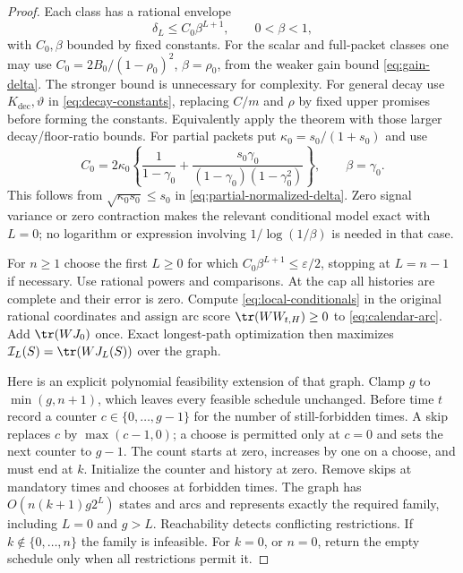 \begin{proof}
Each class has a rational envelope
\begin{equation}
 \delta_L\le C_0\beta^{L+1},\qquad 0<\beta<1,
 \label{eq:complexity-envelope}
\end{equation}
with $C_0,\beta$ bounded by fixed constants. For the scalar and full-packet
classes one may use $C_0=2B_0/(1-\rho_0)^2$, $\beta=\rho_0$, from the
weaker gain bound \eqref{eq:gain-delta}. The stronger bound is unnecessary
for complexity. For general decay use $K_{\mathrm{dec}},\vartheta$ in
\eqref{eq:decay-constants}, replacing $C/m$ and $\rho$ by fixed upper
promises before forming the constants. Equivalently apply the theorem with
those larger decay/floor-ratio bounds. For partial packets put
$\kappa_0=s_0/(1+s_0)$ and use
\[
 C_0=2\kappa_0\left\{\frac1{1-\gamma_0}
       +\frac{s_0\gamma_0}{(1-\gamma_0)(1-\gamma_0^2)}\right\},
 \qquad\beta=\gamma_0.
\]
This follows from $\sqrt{\kappa_0s_0}\le s_0$ in
\eqref{eq:partial-normalized-delta}. Zero signal variance or zero contraction
makes the relevant conditional model exact with $L=0$; no logarithm or
expression involving $1/\log(1/\beta)$ is needed in that case.

For $n\ge1$ choose the first $L\ge0$ for which
$C_0\beta^{L+1}\le\varepsilon/2$, stopping at $L=n-1$ if necessary.
Use rational powers and comparisons. At the cap all histories are complete
and their error is zero. Compute \eqref{eq:local-conditionals} in the
original rational coordinates and assign arc score
$\tr(W W_{t,H})\ge0$ to \eqref{eq:calendar-arc}. Add
$\tr(WJ_0)$ once. Exact longest-path optimization then maximizes
$\mathcal I_L(S)=\tr(WJ_L(S))$ over the graph.

Here is an explicit polynomial feasibility extension of that graph.
Clamp $g$ to $\min(g,n+1)$, which leaves every feasible schedule unchanged.
Before time $t$ record a counter $c\in\{0,\ldots,g-1\}$ for the number of
still-forbidden times. A skip replaces $c$ by $\max(c-1,0)$; a choose is
permitted only at $c=0$ and sets the next counter to $g-1$. The count starts
at zero, increases by one on a choose, and must end at $k$. Initialize the
counter and history at zero. Remove skips at mandatory times and chooses
at forbidden times. The graph has
$O(n(k+1)g2^L)$ states and arcs and represents exactly the required family,
including $L=0$ and $g>L$. Reachability detects conflicting restrictions.
If $k\notin\{0,\ldots,n\}$ the family is infeasible. For $k=0$, or $n=0$,
return the empty schedule only when all restrictions permit it.


\end{proof}
